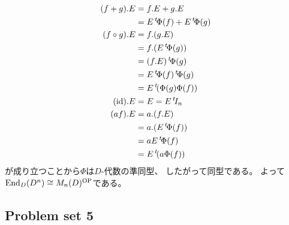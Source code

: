 \documentclass[report]{jlreq}
\begin{document}
\begin{answer}
\begin{alignat}{1}
        (f + g) . E
            &= f.E + g.E \\
            &= E \up{t}\Phi(f) + E \up{t}\Phi(g) \\
        (f \circ g) . E
            &= f . (g . E) \\
            &= f . (E \up{t}\Phi(g)) \\
            &= (f . E) \up{t}\Phi(g) \\
            &= E \up{t}\Phi(f) \up{t}\Phi(g) \\
            &= E \up{t}(\Phi(g) \Phi(f)) \\
        (\id) . E
            &= E = E \up{t} I_n \\
        (af) . E
            &= a . (f . E) \\
            &= a . (E \up{t}\Phi(f)) \\
            &= aE \up{t}\Phi(f) \\
            &= E \up{t} (a \Phi(f))
    \end{alignat}
    が成り立つことから$\Phi$は$D$-代数の準同型、
    したがって同型である。
    よって$\operatorname{End}_D(D^n) \cong M_n(D)^{\mathrm{OP}}$である。
\end{answer}

\subsection{Problem set 5}

\end{document}
